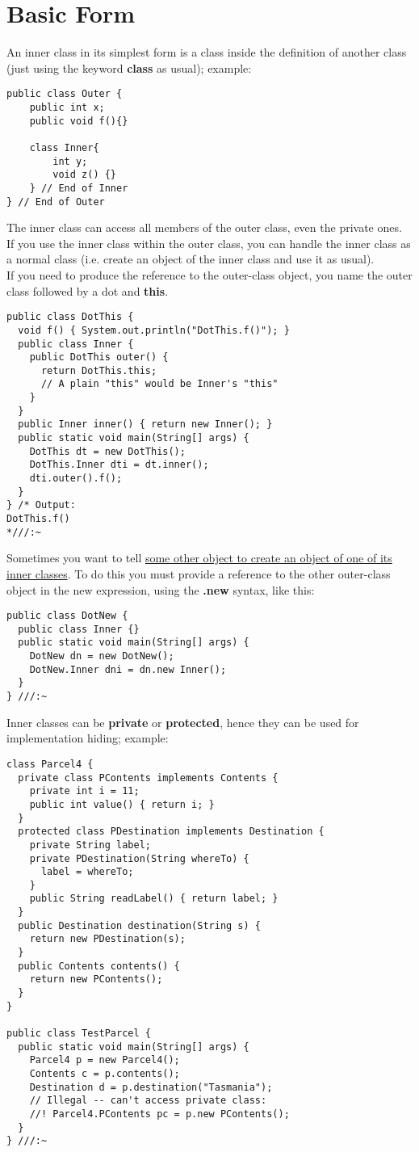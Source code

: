 \documentclass[10pt,letterpaper]{report}
\begin{document}
\section{Basic Form}
An inner class in its simplest form is a class inside the definition of another class (just using the keyword \textbf{class} as usual); example:
\begin{lstlisting}
public class Outer {
	public int x;
	public void f(){}
	
	class Inner{
		int y;
		void z() {}
	} // End of Inner
} // End of Outer
\end{lstlisting}
The inner class can access all members of the outer class, even the private ones.\\

If you use the inner class within the outer class, you can handle the inner class as a normal class (i.e. create an object of the inner class and use it as usual).\\

If you need to produce the reference to the outer-class object, you name the outer class followed by a dot and \textbf{this}.
\begin{lstlisting}
public class DotThis {
  void f() { System.out.println("DotThis.f()"); }
  public class Inner {
    public DotThis outer() {
      return DotThis.this;
      // A plain "this" would be Inner's "this"
    }
  }
  public Inner inner() { return new Inner(); }
  public static void main(String[] args) {
    DotThis dt = new DotThis();
    DotThis.Inner dti = dt.inner();
    dti.outer().f();
  }
} /* Output:
DotThis.f()
*///:~
\end{lstlisting}
Sometimes you want to tell \underline{some other object to create an object of one of its} \underline{inner classes}. To do this you must provide a reference to the other outer-class object in the new expression, using the \textbf{.new} syntax, like this:
\begin{lstlisting}
public class DotNew {
  public class Inner {}
  public static void main(String[] args) {
    DotNew dn = new DotNew();
    DotNew.Inner dni = dn.new Inner();
  }
} ///:~
\end{lstlisting}
Inner classes can be \textbf{private} or \textbf{protected}, hence they can be used for implementation hiding; example:
\begin{lstlisting}
class Parcel4 {
  private class PContents implements Contents {
    private int i = 11;
    public int value() { return i; }
  }
  protected class PDestination implements Destination {
    private String label;
    private PDestination(String whereTo) {
      label = whereTo;
    }
    public String readLabel() { return label; }
  }
  public Destination destination(String s) {
    return new PDestination(s);
  }
  public Contents contents() {
    return new PContents();
  }
}

public class TestParcel {
  public static void main(String[] args) {
    Parcel4 p = new Parcel4();
    Contents c = p.contents();
    Destination d = p.destination("Tasmania");
    // Illegal -- can't access private class:
    //! Parcel4.PContents pc = p.new PContents();
  }
} ///:~
\end{lstlisting}
\end{document}
